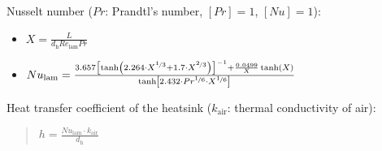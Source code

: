 \documentclass[fontsize=9pt,a4paper,twocolumn]{scrartcl}
\begin{document}
Nusselt number ($Pr$: Prandtl's number, $[Pr]=1$, $[Nu]=1$):
\begin{itemize}
	\item $X = \frac{L}{d_\mathrm{h} Re_\mathrm{lam} Pr}$
	\item $Nu_\mathrm{lam} = \frac{3.657\left[\tanh\left(2.264\cdot X^{\nicefrac{1}{3}} + 1.7\cdot X^{\nicefrac{2}{3}}\right)\right]^{-1} + \frac{0.0499}{X}\tanh(X)}{\tanh\left[2.432\cdot Pr^{\nicefrac{1}{6}}\cdot X^{\nicefrac{1}{6}}\right]}$
\end{itemize}

Heat transfer coefficient of the heatsink ($k_\mathrm{air}$: thermal conductivity of air):
\begin{quote}
	$h = \frac{Nu_\mathrm{lam}\cdot k_\mathrm{air}}{d_\mathrm{h}}$
\end{quote}
\end{document}
